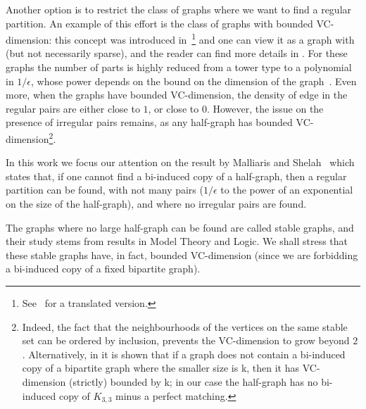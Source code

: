     Another option is to restrict the class of graphs where we want to find a regular partition.
    An example of this effort is the class of graphs with bounded VC-dimension: this concept was introduced
    in~\cite{the_uniform_convergence_of_frequencies_of_the_appearance_of_events_to_their_probabilities}\footnote{
        See~\cite{on_the_uniform_convergence_of_relative_frequencies_of_events_to_their_probabilities}
        for a translated version.}
    and one can view it as a graph with  (but not necessarily sparse), and the reader can find more
    details in .
    For these graphs the number of parts is highly reduced from a tower type to a polynomial in $1/\epsilon$, whose
    power depends on the bound on the dimension of the graph~\cite{regularity_partitions_and_the_topology_of_graphons,
        erdos_hajnal_conjecture_for_graphs_with_bounded_vc_dimension,
        efficient_testing_of_bipartite_graphs_for_forbidden_induced_subgraphs}.
    Even more, when the graphs have bounded VC-dimension, the density of edge in the regular pairs are either close to $1$,
    or close to $0$.
    However, the issue on the presence of irregular pairs remains, as any half-graph has bounded VC-dimension\footnote{
        Indeed, the fact that the neighbourhoods of the vertices on the same stable set can be ordered by inclusion,
        prevents the VC-dimension to grow beyond $2$.
        Alternatively, in \cite{regularity_partitions_and_the_topology_of_graphons} it is shown that if a graph does not
        contain a bi-induced copy of a bipartite graph where the smaller size is k, then it has VC-dimension (strictly)
        bounded by k; in our case the half-graph has no bi-induced copy of $K_{3,3}$ minus a perfect matching.}.

    In this work we focus our attention on the result by Malliaris and Shelah~\cite{regularity_lemmas_for_stable_graphs,
        notes_on_the_stable_regularity_lemma}
    which states that, if one cannot find a bi-induced copy of a half-graph, then a regular partition can be found, with
    not many pairs ($1/\epsilon$ to the power of an exponential on the size of the half-graph), and where no irregular
    pairs are found.

    The graphs where no large half-graph can be found are called stable graphs, and their study stems from results in
    Model Theory and Logic.
    We shall stress that these stable graphs have, in fact, bounded VC-dimension (since we are forbidding a bi-induced
    copy of a fixed bipartite graph).

